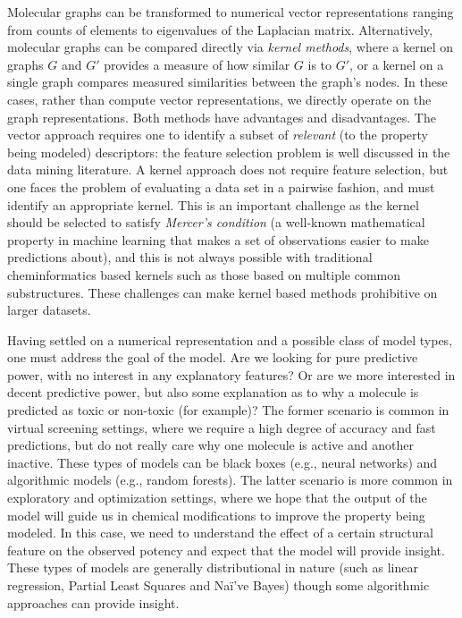 \documentclass{sig-alternate}
\begin{document}
Molecular graphs can be transformed to numerical vector
representations ranging from counts of elements to eigenvalues of the
Laplacian matrix.  Alternatively, molecular graphs can be compared 
directly via \emph{kernel methods}, where a kernel on graphs $G$ and
$G'$ provides a measure of how similar $G$ is to $G'$, or a kernel on
a single graph compares measured similarities between the graph's
nodes. In these cases, rather than compute vector representations, we
directly operate on the graph representations.  Both methods have
advantages and disadvantages. The vector approach requires one to
identify a subset of \emph{relevant} (to the property being modeled)
descriptors: the feature selection problem is well discussed in the
data mining literature. A kernel approach does not require feature
selection, but one faces the problem of evaluating a data set in a
pairwise fashion, and must identify an appropriate kernel. This is an
important challenge as the kernel should be selected to satisfy
\emph{Mercer's condition} (a well-known mathematical property in
machine learning that makes a set of observations easier to make
predictions about), and this is not always possible with traditional
cheminformatics based kernels such as those based on multiple common
substructures.  These challenges can make kernel based methods
prohibitive on larger datasets.

Having settled on a numerical representation and a possible class of
model types, one must address the goal of the model. Are we looking
for pure predictive power, with no interest in any explanatory
features? Or are we more interested in decent predictive power, but
also some explanation as to why a molecule is predicted as toxic or
non-toxic (for example)? The former scenario is common in virtual
screening settings, where we require a high degree of accuracy and
fast predictions, but do not really care why one molecule is active
and another inactive. These types of models can be black boxes (e.g.,
neural networks) and algorithmic models \cite{Breiman:2001fk} (e.g., random
forests). The latter scenario is more common in exploratory and
optimization settings, where we hope that the output of the model will
guide us in chemical modifications to improve the property being
modeled.  In this case, we need to understand the effect of a certain
structural feature on the observed potency and expect that the model
will provide insight. These types of models are generally
distributional in nature (such as linear regression, Partial Least
Squares and Na\"{i'}ve Bayes) though some algorithmic approaches
 can provide insight.
\end{document}
